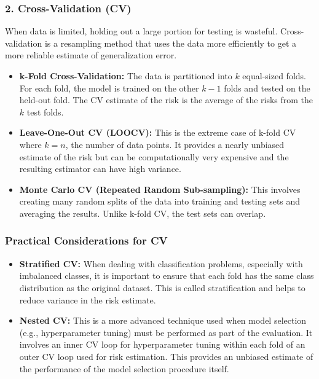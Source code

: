 \documentclass{article}
\begin{document}
\begin{multicols}{2}
\subsubsection{2. Cross-Validation (CV)}
When data is limited, holding out a large portion for testing is wasteful. Cross-validation is a resampling method that uses the data more efficiently to get a more reliable estimate of generalization error.

\begin{itemize}
    \item \textbf{k-Fold Cross-Validation:} The data is partitioned into $k$ equal-sized folds. For each fold, the model is trained on the other $k-1$ folds and tested on the held-out fold. The CV estimate of the risk is the average of the risks from the $k$ test folds.
    \item \textbf{Leave-One-Out CV (LOOCV):} This is the extreme case of k-fold CV where $k=n$, the number of data points. It provides a nearly unbiased estimate of the risk but can be computationally very expensive and the resulting estimator can have high variance.
    \item \textbf{Monte Carlo CV (Repeated Random Sub-sampling):} This involves creating many random splits of the data into training and testing sets and averaging the results. Unlike k-fold CV, the test sets can overlap.
\end{itemize}

\subsubsection{Practical Considerations for CV}
\begin{itemize}
    \item \textbf{Stratified CV:} When dealing with classification problems, especially with imbalanced classes, it is important to ensure that each fold has the same class distribution as the original dataset. This is called stratification and helps to reduce variance in the risk estimate.
    \item \textbf{Nested CV:} This is a more advanced technique used when model selection (e.g., hyperparameter tuning) must be performed as part of the evaluation. It involves an inner CV loop for hyperparameter tuning within each fold of an outer CV loop used for risk estimation. This provides an unbiased estimate of the performance of the model selection procedure itself.
\end{itemize}



\end{multicols}
\end{document}
